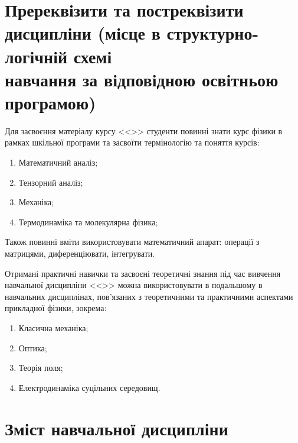 \documentclass{Syllabus}
\begin{document}
\section{Пререквізити та постреквізити дисципліни (місце в структурно-логічній схемі\\ навчання за відповідною освітньою програмою)}


Для засвоєння матеріалу курсу <<\discipline>> студенти повинні знати курс фізики в рамках шкільної програми та засвоїти термінологію та поняття курсів:
\begin{enumerate}
	\item Математичний аналіз;
	\item Тензорний аналіз;
	\item Механіка;
	\item Термодинаміка та молекулярна фізика;
\end{enumerate}

Також повинні вміти використовувати математичний апарат: операції з матрицями,  диференціювати, інтегрувати.

Отримані практичні навички та засвоєні теоретичні знання під час вивчення навчальної дисципліни <<\discipline>> можна використовувати в подальшому в навчальних дисциплінах, пов’язаних з теоретичними та практичними аспектами прикладної фізики, зокрема:

\begin{enumerate}
	\item Класична механіка;
	\item Оптика;
	\item Теорія поля;
	\item Електродинаміка суцільних середовищ.
\end{enumerate}


\section{Зміст навчальної дисципліни}

\end{document}

